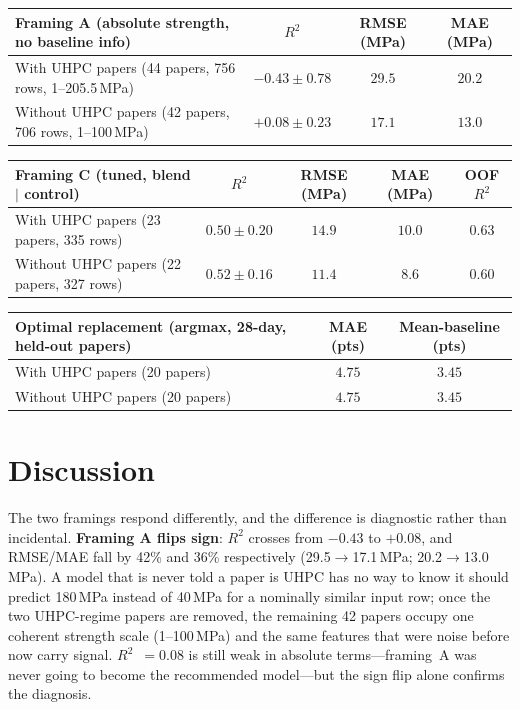 \documentclass[11pt]{article}
\newcommand{\R}{$R^2$}
\begin{document}
\begin{center}\small
\begin{tabular}{lccc}
\toprule
\textbf{Framing A} (absolute strength, no baseline info) & \R{} & RMSE (MPa) & MAE (MPa) \\
\midrule
With UHPC papers (44 papers, 756 rows, 1--205.5\,MPa) & $-0.43\pm0.78$ & $29.5$ & $20.2$ \\
Without UHPC papers (42 papers, 706 rows, 1--100\,MPa) & $\mathbf{+0.08\pm0.23}$ & $\mathbf{17.1}$ & $\mathbf{13.0}$ \\
\bottomrule
\end{tabular}
\end{center}

\begin{center}\footnotesize
\begin{tabular}{lcccc}
\toprule
\textbf{Framing C} (tuned, blend $\mid$ control) & \R{} & RMSE (MPa) & MAE (MPa) & OOF \R{} \\
\midrule
With UHPC papers (23 papers, 335 rows) & $0.50\pm0.20$ & $14.9$ & $10.0$ & $0.63$ \\
Without UHPC papers (22 papers, 327 rows) & $\mathbf{0.52\pm0.16}$ & $\mathbf{11.4}$ & $\mathbf{8.6}$ & $0.60$ \\
\bottomrule
\end{tabular}
\end{center}

\begin{center}\small
\begin{tabular}{lcc}
\toprule
\textbf{Optimal replacement} (argmax, 28-day, held-out papers) & MAE (pts) & Mean-baseline (pts) \\
\midrule
With UHPC papers (20 papers) & $4.75$ & $3.45$ \\
Without UHPC papers (20 papers) & $4.75$ & $3.45$ \\
\bottomrule
\end{tabular}
\end{center}

\section{Discussion}
\label{sec:part2-discussion}
The two framings respond differently, and the difference is diagnostic rather than
incidental. \textbf{Framing A flips sign}: \R{} crosses from $-0.43$ to $+0.08$, and
RMSE/MAE fall by 42\% and 36\% respectively (29.5$\to$17.1\,MPa; 20.2$\to$13.0\,MPa). A
model that is never told a paper is UHPC has no way to know it should predict
180\,MPa instead of 40\,MPa for a nominally similar input row; once the two UHPC-regime
papers are removed, the remaining 42 papers occupy one coherent strength scale
(1--100\,MPa) and the same features that were noise before now carry signal. \R{}~$=0.08$
is still weak in absolute terms---framing~A was never going to become the recommended
model---but the sign flip alone confirms the diagnosis.
\end{document}
